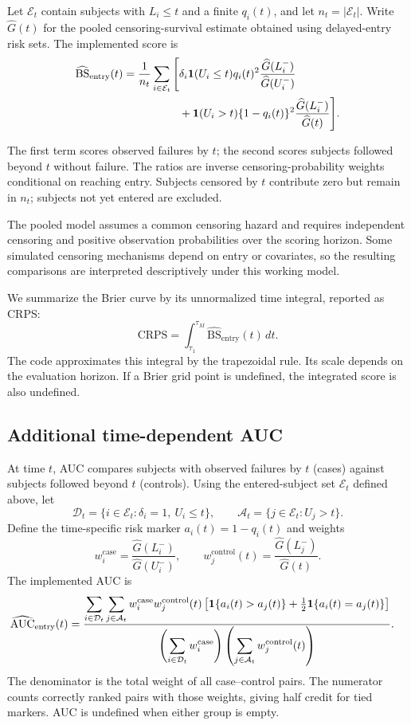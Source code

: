 Let $\mathcal E_t$ contain subjects with $L_i\leq t$ and a finite
$q_i(t)$, and let $n_t=|\mathcal E_t|$. Write $\widehat G(t)$ for the
pooled censoring-survival estimate obtained using delayed-entry risk
sets. The implemented score is
\begin{align}
 \widehat{\mathrm{BS}}_{\mathrm{entry}}(t)
 =\frac{1}{n_t}\sum_{i\in\mathcal E_t}
 \Bigg[&
 \delta_i\mathbf{1}(U_i\leq t)q_i(t)^2
 \frac{\widehat G(L_i^-)}{\widehat G(U_i^-)}
 \nonumber\\
 &+\mathbf{1}(U_i>t)\{1-q_i(t)\}^2
 \frac{\widehat G(L_i^-)}{\widehat G(t)}
 \Bigg].
\end{align}

The first term scores observed failures by $t$; the second scores
subjects followed beyond $t$ without failure. The ratios are inverse
censoring-probability weights conditional on reaching entry.
Subjects censored by $t$ contribute zero but remain in $n_t$;
subjects not yet entered are excluded.

The pooled model assumes a common censoring hazard and requires
independent censoring and positive observation probabilities over
the scoring horizon. Some simulated censoring mechanisms depend
on entry or covariates, so the resulting comparisons are interpreted
descriptively under this working model.

We summarize the Brier curve by its unnormalized time integral,
reported as CRPS:
\[
 \mathrm{CRPS}=\int_{\tau_1}^{\tau_M}
       \widehat{\mathrm{BS}}_{\mathrm{entry}}(t)\,dt.
\]
The code approximates this integral by the trapezoidal rule.
Its scale depends on the evaluation horizon. If a Brier grid point
is undefined, the integrated score is also undefined.

\subsection{Additional time-dependent AUC}

At time $t$, AUC compares subjects with observed failures by $t$
(cases) against subjects followed beyond $t$ (controls). Using the
entered-subject set $\mathcal E_t$ defined above, let
\[
 \mathcal D_t=\{i\in\mathcal E_t:\delta_i=1,\ U_i\leq t\},
 \qquad
 \mathcal A_t=\{j\in\mathcal E_t:U_j>t\}.
\]
Define the time-specific risk marker $a_i(t)=1-q_i(t)$ and weights
\[
 w_i^{\mathrm{case}}
 =\frac{\widehat G(L_i^-)}{\widehat G(U_i^-)},
 \qquad
 w_j^{\mathrm{control}}(t)
 =\frac{\widehat G(L_j^-)}{\widehat G(t)}.
\]
The implemented AUC is
\begin{align}
 \widehat{\mathrm{AUC}}_{\mathrm{entry}}(t)
 &=
 \frac{
   \displaystyle\sum_{i\in\mathcal D_t}
   \sum_{j\in\mathcal A_t}
   w_i^{\mathrm{case}}w_j^{\mathrm{control}}(t)
   \left[
    \mathbf{1}\{a_i(t)>a_j(t)\}
    +\tfrac12\mathbf{1}\{a_i(t)=a_j(t)\}
   \right]
 }{
   \displaystyle
   \left(\sum_{i\in\mathcal D_t}w_i^{\mathrm{case}}\right)
   \left(\sum_{j\in\mathcal A_t}w_j^{\mathrm{control}}(t)\right)
 }.
\end{align}
The denominator is the total weight of all case--control pairs.
The numerator counts correctly ranked pairs with those weights,
giving half credit for tied markers. AUC is undefined when either
group is empty.


